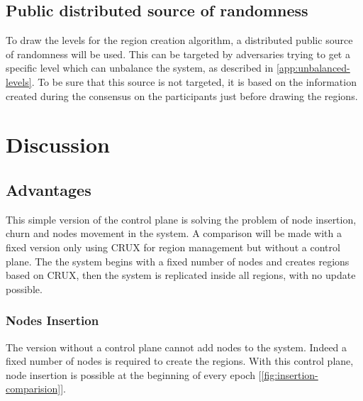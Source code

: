 \documentclass[a4paper,11pt,oneside]{report}
\begin{document}
\subsection{Public distributed source of randomness}
To draw the levels for the region creation algorithm, a distributed public
source of randomness will be used. This can be targeted by adversaries trying to
get a specific level which can unbalance the system, as described in \autoref{app:unbalanced-levels}. To be sure that this
source is not targeted, it is based on the information created during the
consensus on the participants just before drawing the regions. 

\FloatBarrier
\section{Discussion}
\subsection{Advantages}
This simple version of the control plane is solving the problem of
node insertion, churn and nodes movement in the system. A comparison will be made with a fixed
version only using CRUX for region management but without a control plane. The
the system begins with a fixed number of nodes and creates regions based on CRUX,
then the system is replicated inside all regions, with no update possible.

\subsubsection{Nodes Insertion}
The version without a control plane cannot add nodes to the system. Indeed a
fixed number of nodes is required to create the regions. With this control
plane, node insertion is possible at the beginning of every epoch
[\autoref{fig:insertion-comparision}].
\end{document}
